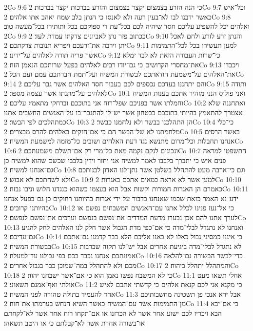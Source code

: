 2Co 9:6  כי הנה הזרע בצמצום יקצר בצמצום והזרע בברכות יקצר בברכות׃
2Co 9:7  וכל־איש כאשר ידבנו לבו לא־בעין רעה ולא לאנסו כי הנתן בלב שמח יאהב אתו אלהים׃
2Co 9:8  ואלהים יכל להשפיע עליכם חסד שיהיה לכם בכל־עת די ספוקכם בכל ותותירו בכל־מעשה טוב׃
2Co 9:9  ככתוב פזר נתן לאביונים צדקתו עמדת לעד׃
2Co 9:10  והנתן זרע לזרע ולחם לאכל יתן וירבה את־זרעכם ויפריא תנובות צדקתכם׃
2Co 9:11  למען תעשירו בכל לכל־התמימות אשר פריה תודה לאלהים על־ידינו׃
2Co 9:12  כי־שרות העבודה הזאת לא לבד ימלא את־מחסרי הקדושים כי גם־יודו רבים לאלהים בפעל שרותכם הנאמן הזה׃
2Co 9:13  ויכבדו את־האלהים על־משמעת הודאתכם לבשורת המשיח ועל־תמת חברתכם עמם ועם הכל׃
2Co 9:14  והם יתחננו בעדכם נכספים לכם בעבור חסד האלהים אשר גבר עליכם׃
2Co 9:15  ותודה לאלהים על־מתנתו אשר עצמה מספר׃
2Co 10:1  ואני פולוס הנני מזהיר אתכם בענות המשיח וחמלתו אשר בפניכם שפל־רוח אני בתוככם וברחקי מתאמץ עליכם׃
2Co 10:2  ואתחננה שלא אצטרך להתאמץ בהיותי בתוככם בבטחון אשר יש־לי להתגבר־בו על־האנשים החשבים אתנו כמתהלכים לפי הבשר׃
2Co 10:3  הן התהלכנו בבשר ולא נלחמנו כבשר׃
2Co 10:4  כי־כלי מלחמתנו לא של־הבשר הם כי אם־חזקים באלהים להרס מבצרים׃
2Co 10:5  באשר הרסים אנחנו תחבלות וכל־מרום מתנשא נגד דעת האלהים ושובים כל־מזמה למשמעת המשיח׃
2Co 10:6  ונכונים לנקם נקמה מאת כל־מרי רק אם־תשלם משמעתכם׃
2Co 10:7  התשפטו למראה פנים איש כי יתברך בלבבו לאמר למשיח אני יחזר וידין בלבבו שכשם שהוא למשיח כן גם־אנחנו למשיח׃
2Co 10:8  וגם כי־ארבה מעט להתהלל בשלטן אשר נתן־לנו האדון לבנותכם ולא לשחתכם לא אבוש׃
2Co 10:9  למען אשר לא אראה כמאים אתכם באגרות׃
2Co 10:10  כאמרם הן האגרות חמורות וקשות אבל הוא בעצמו כשהוא כנגדנו חלוש וניבו נבזה׃
2Co 10:11  ידע־נא האמר כזאת שכמו שאנחנו בדבור על־ידי אגרות בהיותנו רחוקים כן גם־בפעל אנחנו בהיותנו קרובים׃
2Co 10:12  כי אל־נעז פנינו לכלל אתנו עם־האנשים המשבחים נפשם או לערך אתנו להם אכן נבערו מדעת המדדים את־נפשם בנפשם וערכים את־נפשם לנפשם׃
2Co 10:13  ואנחנו לא נתגדל לבלי־מדה כי אם־כפי מדת הגבול אשר חלק לנו האלהים לחק להגיע גם־עדיכם׃
2Co 10:14  כי איננו כמסיגי גבול כאלו לא באנו אליכם הלא כבר קדמנו גם־אתכם בבשורת המשיח׃
2Co 10:15  לא נתגדל לבלי־מדה ביגיעת אחרים אבל יש־לנו תקוה שברבות אמונתכם אנחנו נכבד בכם כפי גבולנו עד־למעלה׃
2Co 10:16  כדי־לבשר הבשורה גם־להלאה מכם ולא להתהלל במה־שמוכן כבר בגבול אחרים׃
2Co 10:17  והמתהלל יתהלל ביהוה׃
2Co 10:18  כי לא המשבח נפשו נאמן הוא כי אם־אשר ישבחנו יהוה׃
2Co 11:1  אחלי תשאו מעט אולתי ואף־אמנם תשאוני׃
2Co 11:2  כי מקנא אני לכם קנאת אלהים כי קדשתי אתכם לאיש אחד להעמיד בתולה טהורה לפני המשיח׃
2Co 11:3  אבל ירא אנכי פן תשטינה מחשבותיכם מן־התמימות אשר עם־המשיח כאשר השיא הנחש בערמתו את־חוה׃
2Co 11:4  כי אם־יבא הבא ויכריז לכם ישוע אחר אשר לא הכרזנו או אם־תקחו רוח אחר אשר לא־לקחתם או־בשורה אחרת אשר לא־קבלתם כי אז היטב תשאהו׃
